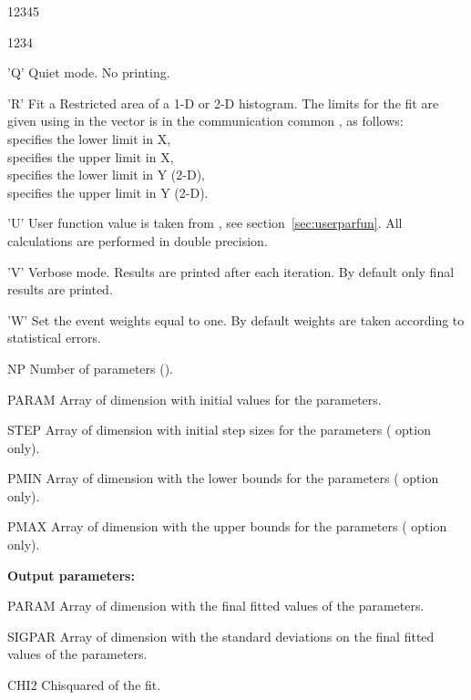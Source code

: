 \begin{DLtt}{12345}
\begin{DLtt}{1234}
\item['Q'] Quiet mode. No printing.
\item['R'] Fit a Restricted area of a 1-D or 2-D histogram.
           The limits for the fit are given using in the vector  
           is in the communication common , as follows:\\
%
            specifies the lower limit in X,\\
            specifies the upper limit in X,\\
            specifies the lower limit in Y (2-D),\\
            specifies the upper limit in Y (2-D).
\item['U'] User function value is taken from ,
%
           see section~\ref{sec:userparfun}.
           All calculations are performed in double precision.
\item['V'] Verbose mode.
           Results are printed after each iteration.
           By default only final results are printed.
\item['W'] Set the event weights equal to one.
           By default weights are taken according to statistical errors.
\end{DLtt}
\item[NP]  Number of parameters ().
\item[PARAM] Array of dimension  with initial values for
      the parameters.
\item[STEP] Array of dimension  with initial step sizes
      for the parameters ( option only).
\item[PMIN] Array of dimension  with the lower bounds
      for the parameters ( option only).
\item[PMAX] Array of dimension  with the upper bounds
      for the parameters ( option only).
\item[{\rm\bf Output parameters:}]
\item[PARAM] Array of dimension  with the final fitted values
      of the parameters.
\item[SIGPAR] Array of dimension  with the standard deviations
      on the final fitted values of the parameters.
\item[CHI2] Chisquared of the fit.
\end{DLtt}
 
